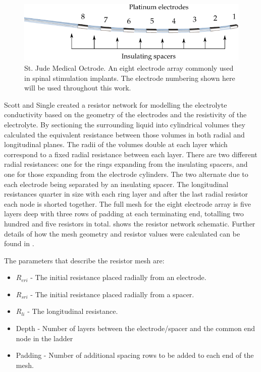     \begin{figure}
      \centering
      \includegraphics{content/pt2/07-InterfaceModel/graphics/StJudeOctrodeDiagram}
      \caption{\label{fig:StJudeOctrode_Labelled}St. Jude Medical Octrode. An eight electrode array commonly used in spinal stimulation implants. The electrode numbering shown here will be used throughout this work.}
    \end{figure}


    Scott and Single created a resistor network for modelling the electrolyte conductivity based on the geometry of the electrodes and the resistivity of the electrolyte.
    By sectioning the surrounding liquid into cylindrical volumes they calculated the equivalent resistance between those volumes in both radial and longitudinal planes.
    The radii of the volumes double at each layer which correspond to a fixed radial resistance between each layer.
    There are two different radial resistances: one for the rings expanding from the insulating spacers, and one for those expanding from the electrode cylinders.
    The two alternate due to each electrode being separated by an insulating spacer.
    The longitudinal resistances quarter in size with each ring layer and after the last radial resistor each node is shorted together.
    The full mesh for the eight electrode array is five layers deep with three rows of padding at each terminating end, totalling two hundred and five resistors in total.
     shows the resistor network schematic.
    Further details of how the mesh geometry and resistor values were calculated can be found in \cite{Scott2014}.

    The parameters that describe the resistor mesh are:
    \begin{itemize}
    \item $R_{eri}$ - The initial resistance placed radially from an electrode.
    \item $R_{sri}$ - The initial resistance placed radially from a spacer.
    \item $R_{li}$ - The longitudinal resistance.
    \item Depth - Number of layers between the electrode/spacer and the common end node in the ladder
    \item Padding - Number of additional spacing rows to be added to each end of the mesh.
    \end{itemize}

